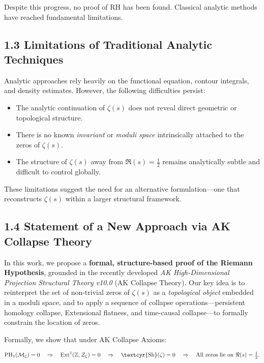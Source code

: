 \documentclass[11pt]{article}
\newcommand{\Sha}{\text{\textcyr{Sh}}}
\begin{document}
Despite this progress, no proof of RH has been found. Classical analytic methods have reached fundamental limitations.

\subsection{1.3 Limitations of Traditional Analytic Techniques}

Analytic approaches rely heavily on the functional equation, contour integrals, and density estimates.  
However, the following difficulties persist:

\begin{itemize}
    \item The analytic continuation of $\zeta(s)$ does not reveal direct geometric or topological structure.
    \item There is no known \emph{invariant} or \emph{moduli space} intrinsically attached to the zeros of $\zeta(s)$.
    \item The structure of $\zeta(s)$ away from $\Re(s) = \tfrac{1}{2}$ remains analytically subtle and difficult to control globally.
\end{itemize}

These limitations suggest the need for an alternative formulation—one that reconstructs $\zeta(s)$ within a larger structural framework.

\subsection{1.4 Statement of a New Approach via AK Collapse Theory}

In this work, we propose a \textbf{formal, structure-based proof of the Riemann Hypothesis}, grounded in the recently developed \emph{AK High-Dimensional Projection Structural Theory v10.0} (AK Collapse Theory).  
Our key idea is to reinterpret the set of non-trivial zeros of $\zeta(s)$ as a \emph{topological object} embedded in a moduli space,  
and to apply a sequence of collapse operations—persistent homology collapse, Extensional flatness, and time-causal collapse—to formally constrain the location of zeros.

Formally, we show that under AK Collapse Axioms:

\[
\mathrm{PH}_1(\mathcal{M}_\zeta) = 0 \quad \Rightarrow \quad \mathrm{Ext}^1(\mathbb{Z}, \mathcal{Z}_\zeta) = 0 \quad \Rightarrow \quad \Sha(\zeta) = 0 \quad \Rightarrow \quad \text{All zeros lie on } \Re(s) = \tfrac{1}{2}.
\]
\end{document}

